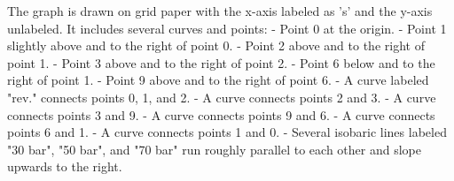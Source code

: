 The graph is drawn on grid paper with the x-axis labeled as 's' and the y-axis unlabeled. It includes several curves and points:
- Point 0 at the origin.
- Point 1 slightly above and to the right of point 0.
- Point 2 above and to the right of point 1.
- Point 3 above and to the right of point 2.
- Point 6 below and to the right of point 1.
- Point 9 above and to the right of point 6.
- A curve labeled "rev." connects points 0, 1, and 2.
- A curve connects points 2 and 3.
- A curve connects points 3 and 9.
- A curve connects points 9 and 6.
- A curve connects points 6 and 1.
- A curve connects points 1 and 0.
- Several isobaric lines labeled "30 bar", "50 bar", and "70 bar" run roughly parallel to each other and slope upwards to the right.